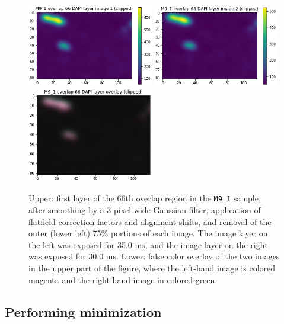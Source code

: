 \documentclass[letterpaper,11pt]{article}
\begin{document}
\begin{figure}[!ht]
\centering
\includegraphics[width=0.49\textwidth]{images/methods/smoothed_flatfielded_aligned_clipped_M9_1_overlap_66_dapi_image_1}
\includegraphics[width=0.49\textwidth]{images/methods/smoothed_flatfielded_aligned_clipped_M9_1_overlap_66_dapi_image_2}
\includegraphics[width=0.49\textwidth]{images/methods/smoothed_flatfielded_aligned_clipped_M9_1_overlap_66_dapi_overlay}
\caption{\footnotesize Upper: first layer of the 66th overlap region in the \texttt{M9\_1} sample, after smoothing by a 3 pixel-wide Gaussian filter, application of flatfield correction factors and alignment shifts, and removal of the outer (lower left) 75\% portions of each image. The image layer on the left was exposed for 35.0 ms, and the image layer on the right was exposed for 30.0 ms. Lower: false color overlay of the two images in the upper part of the figure, where the left-hand image is colored magenta and the right hand image in colored green.}
\label{fig:smoothed_flatfielded_aligned_clipped_M9_1_overlap_66}
\end{figure}

\subsection{Performing minimization}
\label{ssec:performing_minimization}
\end{document}
